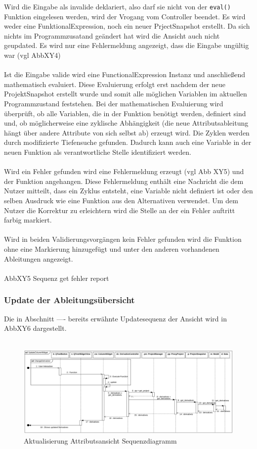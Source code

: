 \documentclass{article}
\begin{document}
\begin{itemize}
Wird die Eingabe als invalide deklariert, also darf sie nicht von der \texttt{eval()} Funktion eingelesen werden, wird der Vrogang vom Controller beendet. Es wird weder eine FunktionalExpression, noch ein neuer PrjectSnapshot erstellt. Da sich nichts im Programmzusatand geändert hat wird die Ansicht auch nicht geupdated. Es wird nur eine Fehlermeldung angezeigt, dass die Eingabe ungültig war (vgl AbbXY4)
\\\\
Ist die Eingabe valide wird eine FunctionalExpression Instanz und anschließend mathematisch evaluiert. Diese Evaluierung erfolgt erst nachdem der neue ProjektSnapshot erstellt wurde und somit alle möglichen Variablen im aktuellen Programmzustand feststehen. Bei der mathematischen Evaluierung wird überprüft, ob alle Variablen, die in der Funktion benötigt werden, definiert sind und, ob möglicherweise eine zyklische Abhängigkeit (die neue Attributsableitung hängt über andere Attribute von sich selbst ab) erzeugt wird. Die Zyklen werden durch modifizierte Tiefensuche gefunden. Dadurch kann auch eine Variable in der neuen Funktion als verantwortliche Stelle identifiziert werden.
\\\\Wird ein Fehler gefunden wird eine Fehlermeldung erzeugt (vgl Abb XY5) und der Funktion angehangen. Diese Fehlermeldung enthält eine Nachricht die dem Nutzer mitteilt, dass ein Zyklus entsteht, eine Variable nicht definiert ist oder den selben Ausdruck wie eine Funktion aus den Alternativen verwendet. Um dem Nutzer die Korrektur zu erleichtern wird die Stelle an der ein Fehler auftritt farbig markiert.\\\\
Wird in beiden Validierungsvorgängen kein Fehler gefunden wird die Funktion ohne eine Markierung hinzugefügt und unter den anderen vorhandenen Ableitungen angezeigt.
\\\\
AbbXY5 Sequenz get fehler report


\subsubsection{Update der Ableitungsübersicht}
Die in Abschnitt ---- bereits erwähnte Updatesequenz der Ansicht wird in AbbXY6 dargestellt. \\\\

\begin{figure}[H]%
    \centering
    \includegraphics[width=13cm]{entwurf/Floriane/UpdateColumnWidget.png}
    \caption{Aktualisierung Attributsansicht Sequenzdiagramm}
\end{figure}


\end{itemize}
\end{document}
